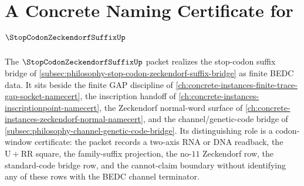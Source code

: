 \chapter{A Concrete Naming Certificate for $\StopCodonZeckendorfSuffixUp$}
\label{ch:concrete-instances-stopcodonzeckendorfsuffix-namecert}

The $\StopCodonZeckendorfSuffixUp$ packet realizes the stop-codon suffix bridge of \autoref{subsec:philosophy-stop-codon-zeckendorf-suffix-bridge} as finite BEDC data. It sits beside the finite GAP discipline of \autoref{ch:concrete-instances-finite-trace-gap-socket-namecert}, the inscription handoff of \autoref{ch:concrete-instances-inscriptionpoint-namecert}, the Zeckendorf normal-word surface of \autoref{ch:concrete-instances-zeckendorf-normal-namecert}, and the channel/genetic-code bridge of \autoref{subsec:philosophy-channel-genetic-code-bridge}. Its distinguishing role is a codon-window certificate: the packet records a two-axis RNA or DNA readback, the $\mathrm{U}+\mathrm{RR}$ square, the family-suffix projection, the no-$11$ Zeckendorf row, the standard-code bridge row, and the cannot-claim boundary without identifying any of these rows with the BEDC channel terminator.


